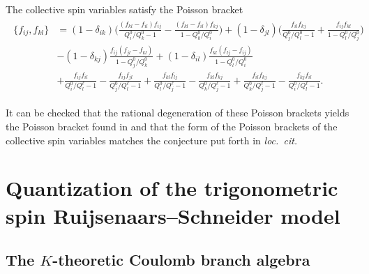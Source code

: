 \begin{prop}
    \def\a{\alpha}
    \def\b{\beta}
    The collective spin variables satisfy the Poisson bracket
    \begin{eqnarray}
        \begin{aligned}
            \{ f_{ij}, f_{kl} \}
            &= (1-\delta_{ik})\bigg(\frac{(f_{kl}-f_{il})f_{ij}}{Q_i^0/Q_k^0-1}-\frac{(f_{kl}-f_{il})f_{kj}}{1-Q_k^0/Q_i^0}\bigg) + (1-\delta_{jl})\bigg(\frac{f_{il} f_{kj}}{Q_j^0/Q_l^0-1}+\frac{f_{ij}f_{kl}}{1-Q_l^0/Q_j^0}\bigg) \\
            &- (1-\delta_{kj})\frac{f_{ij}(f_{jl}-f_{kl})}{1-Q_j^0/Q_k^0}+(1-\delta_{il})\frac{f_{kl}(f_{lj}-f_{ij})}{1-Q_l^0/Q_i^0} \\
            &+ \frac{f_{ij} f_{il}}{Q_i^0/Q_l^\ell-1} -\frac{f_{ij} f_{jl}}{Q_j^0/Q_l^\ell-1} + \frac{f_{kl} f_{lj}}{Q_l^0/Q_j^\ell-1} - \frac{f_{kl} f_{kj}}{Q_k^0/Q_j^\ell-1} + \frac{f_{il} f_{kj}}{Q_k^0/Q_j^\ell-1} - \frac{f_{kj} f_{il}}{Q_i^0/Q_l^\ell-1}.
        \end{aligned}
    \end{eqnarray}
\end{prop}

\begin{remark}
    It can be checked that the rational degeneration of these Poisson brackets yields the Poisson bracket found in \cite{arutyunov_hamiltonian_1998} and that the form of the Poisson brackets of the collective spin variables matches the conjecture put forth in \emph{loc.\ cit.}
\end{remark}

\section{Quantization of the trigonometric spin Ruijsenaars--Schneider model}

\subsection{The $K$-theoretic Coulomb branch algebra}\label{sec:CBAlg}

